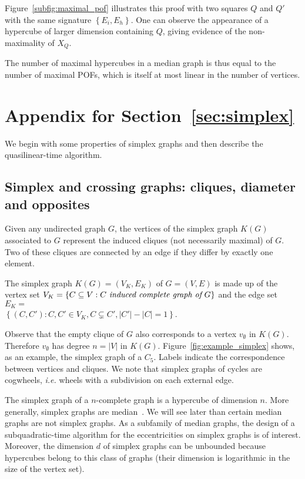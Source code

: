 \documentclass[a4paper,UKenglish,numberwithinsect,cleveref, autoref]{lipics-v2021}
\newcommand{\set}[1]{\left\{ #1 \right\}}
\newcommand{\card}[1]{\left| #1 \right|}
\begin{document}
Figure~\ref{subfig:maximal_pof} illustrates this proof with two squares $Q$ and $Q'$ with the same signature $\set{E_i,E_h}$. One can observe the appearance of a hypercube of larger dimension containing $Q$, giving evidence of the non-maximality of $X_Q$.

The number of maximal hypercubes in a median graph is thus equal to the number of maximal POFs, which is itself at most linear in the number of vertices.

\section{Appendix for Section~\ref{sec:simplex}} \label{asec:simplex}

We begin with some properties of simplex graphs and then describe the quasilinear-time algorithm.

\subsection{Simplex and crossing graphs: cliques, diameter and opposites} \label{subsec:crossing}

Given any undirected graph $G$, the vertices of the simplex graph $K(G)$ associated to $G$ represent the induced cliques (not necessarily maximal) of $G$. Two of these cliques are connected by an edge if they differ by exactly one element.

\begin{definition}
The simplex graph $K(G)=(V_K,E_K)$ of $G=(V,E)$ is made up of the vertex set $V_K = \set{C\subseteq V: C ~\emph{induced complete graph of}~ G}$ and the edge set $E_K = $\\ $\set{(C,C') : C,C' \in V_K, C \subsetneq C', \card{C'}-\card{C} = 1}$.
\label{def:simplex}
\end{definition}

Observe that the empty clique of $G$ also corresponds to a vertex $v_{\emptyset}$ in $K(G)$.  Therefore $v_{\emptyset}$ has degree $n = \card{V}$ in $K(G)$. Figure~\ref{fig:example_simplex} shows, as an example, the simplex graph of a $C_5$. Labels indicate the correspondence between vertices and cliques. We note that simplex graphs of cycles are cogwheels, {\em i.e.} wheels with a subdivision on each external edge.

The simplex graph of a $n$-complete graph is a hypercube of dimension $n$. More generally, simplex graphs are median~\cite{BaCh08,BaLeMo86}. We will see later than certain median graphs are not simplex graphs. As a subfamily of median graphs, the design of a subquadratic-time algorithm for the eccentricities on simplex graphs is of interest. Moreover, the dimension $d$ of simplex graphs can be unbounded because hypercubes belong to this class of graphs (their dimension is logarithmic in the size of the vertex set).
\end{document}
